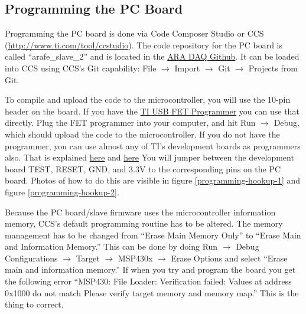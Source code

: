 \documentclass[letter,12pt]{article}
\begin{document}
\subsection{Programming the PC Board}

Programming the PC board is done via Code Composer Studio or CCS (\href{http://www.ti.com/tool/ccstudio}{http://www.ti.com/tool/ccstudio}). The code repository for the PC board is called ``arafe\_slave\_2'' and is located in the \href{https://github.com/ara-daq-hw/arafe_slave_v2}{ARA DAQ Github}. It can be loaded into CCS using CCS's Git capability: File $\rightarrow$ Import $\rightarrow$ Git $\rightarrow$ Projects from Git.

To compile and upload the code to the microcontroller, you will use the 10-pin header on the board. If you have the \href{http://www.ti.com/tool/msp-fet430uif}{TI USB FET Programmer} you can use that directly. Plug the FET programmer into your computer, and hit Run $\rightarrow$ Debug, which should upload the code to the microcontroller. If you do not have the programmer, you can use almost any of TI's development boards as programmers also. That is explained \href{http://43oh.com/2011/11/tutorial-to-use-your-launchpad-as-a-programmer/}{here} and \href{http://www.kerrywong.com/2012/04/02/using-msp430-launchpad-as-programmer/}{here} You will jumper between the development board TEST, RESET, GND, and 3.3V to the corresponding pins on the PC board. Photos of how to do this are visible in figure \ref{programming-hookup-1} and figure \ref{programming-hookup-2}.

Because the PC board/slave firmware uses the microcontroller information memory, CCS's default programming routine has to be altered. The memory management has to be changed from ``Erase Main Memory Only'' to ``Erase Main and Information Memory.'' This can be done by doing Run $\rightarrow$ Debug Configurations $\rightarrow$ Target $\rightarrow$ MSP430x $\rightarrow$ Erase Options and select ``Erase main and information memory.'' If when you try and program the board you get the following error ``MSP430: File Loader: Verification failed: Values at address 0x1000 do not match Please verify target memory and memory map.'' This is the thing to correct.
\end{document}

